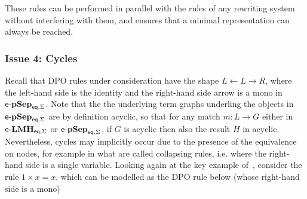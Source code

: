 \documentclass[3p]{elsarticle}
\newcommand{\eq}{\mathsf{eq}}
\newcommand{\catname}[1]{\textbf{\textup{#1}}}
\newcommand{\lelmBis}{\mathsf{e}\text{-}\catname{LMH}_{\eq, \Sigma}}
\newcommand{\lepsBis}{\mathsf{e}\text{-}\catname{pSep}_{\eq, \Sigma}}
\theoremstyle{remark}
\theoremstyle{definition}
\begin{document}
These rules can be performed in parallel with the 
rules of any rewriting system without interfering with them,
and ensures that a minimal representation can always be reached.

\subsubsection{Issue 4: Cycles}
Recall that DPO rules under consideration have the shape
$L \leftarrow L \rightarrow R$, where the left-hand side is the identity 
and the right-hand side arrow is a mono in $\lepsBis$.
%
%
Note that the the underlying term graphs underling the objects in $\lepsBis$
are by definition acyclic, so that for any match $m: L \to G$ either in $\lelmBis$ 
or $\lepsBis$, if $G$ is acyclic then also the result $H$ in acyclic.
%
Nevertheless, cycles may implicitly occur due to the presence of the equivalence 
on nodes, for example in what are called collapsing rules, i.e. where the right-hand side is a single variable. 
%
Looking again at the key example of~\cite{WillseyNWFTP21}, consider the rule $1 \times x = x$,
which can be modelled as the DPO rule below (whose right-hand side is a mono)
\end{document}
